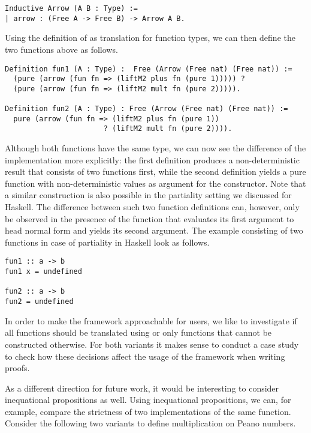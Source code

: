 \begin{verbatim}
Inductive Arrow (A B : Type) :=
| arrow : (Free A -> Free B) -> Arrow A B.
\end{verbatim}

Using the definition of  as translation for function types, we can then define the two functions above as follows.

\begin{verbatim}
Definition fun1 (A : Type) :  Free (Arrow (Free nat) (Free nat)) :=
  (pure (arrow (fun fn => (liftM2 plus fn (pure 1))))) ?
  (pure (arrow (fun fn => (liftM2 mult fn (pure 2))))).

Definition fun2 (A : Type) : Free (Arrow (Free nat) (Free nat)) :=
  pure (arrow (fun fn => (liftM2 plus fn (pure 1))
                       ? (liftM2 mult fn (pure 2)))).
\end{verbatim}

Although both functions have the same type, we can now see the difference of the implementation more explicitly: the first definition produces a non\--deterministic result that consists of two functions first, while the second definition yields a pure function with non\--deterministic values as argument for the  constructor.
Note that a similar construction is also possible in the partiality setting we discussed for Haskell.
The difference between such two function definitions can, however, only be observed in the presence of the function  that evaluates its first argument to head normal form and yields its second argument.
The example consisting of two functions in case of partiality in Haskell look as follows.

\begin{verbatim}
fun1 :: a -> b
fun1 x = undefined

fun2 :: a -> b
fun2 = undefined
\end{verbatim}

In order to make the framework approachable for users, we like to investigate if all functions should be translated using  or only functions that cannot be constructed otherwise.
For both variants it makes sense to conduct a case study to check how these decisions affect the usage of the framework when writing proofs.

As a different direction for future work, it would be interesting to consider inequational propositions as well.
Using inequational propositions, we can, for example, compare the strictness of two implementations of the same function.
Consider the following two variants to define multiplication on Peano numbers.

